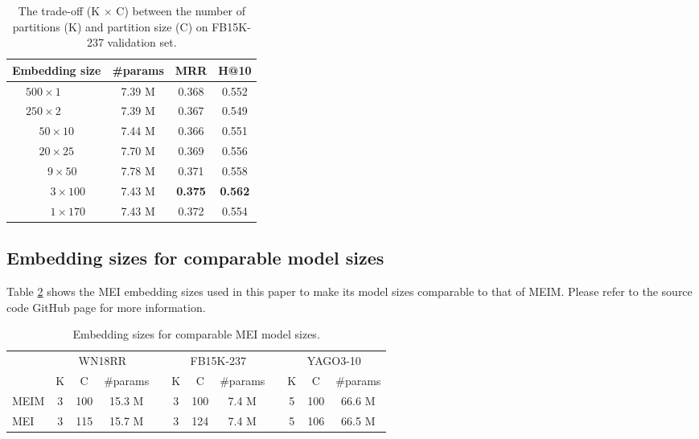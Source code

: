 \documentclass{article}
\theoremstyle{plain}
\theoremstyle{remark}
\begin{document}
\begin{table}[ht]
	\caption[]{The trade-off (K $ \times $ C) between the number of partitions (K) and partition size (C) on FB15K-237 validation set.}
	\label{tab:param_tradeoff}
	\centering  
	\begin{adjustbox}{max width=\linewidth}
		\begin{tabular}{@{\extracolsep{2pt}}cccc}


			Embedding size & \#params & MRR & H@10 \\
			\midrule
			
			$ 500 \times 1 $ \ \ \ \ & 7.39 M & 0.368 & 0.552 \\ $ 250 \times 2 $ \ \ \ \ & 7.39 M & 0.367 & 0.549 \\ $ 50 \times 10 $ & 7.44 M & 0.366 & 0.551 \\ $ 20 \times 25 $ & 7.70 M & 0.369 & 0.556 \\ \ \ $ 9 \times 50 $ & 7.78 M & 0.371 & 0.558 \\ \ \ \ \ $ 3 \times 100 $ & 7.43 M & \textbf{0.375} & \textbf{0.562} \\ \ \ \ \ $ 1 \times 170 $ & 7.43 M & 0.372 & 0.554 \\ 

\end{tabular}
	\end{adjustbox}
\end{table}

\vfill\break

\subsection{Embedding sizes for comparable model sizes}
Table \ref{tab:comparable_size} shows the MEI embedding sizes used in this paper to make its model sizes comparable to that of MEIM. Please refer to the source code GitHub page for more information.

\begin{table}[ht]
	\centering  
	\begin{adjustbox}{max width=\linewidth}
		\begin{tabular}{@{\extracolsep{-4pt}}lccclccclccc}


			& \multicolumn{3}{c}{WN18RR} && \multicolumn{3}{c}{FB15K-237} && \multicolumn{3}{c}{YAGO3-10} \\
			\cmidrule{2-4} \cmidrule{6-8} \cmidrule{10-12}
			& K & C & \#params && K & C & \#params && K & C & \#params \\
\cmidrule{2-4} \cmidrule{6-8} \cmidrule{10-12}
			
			MEIM & 3 & 100 & 15.3 M && 3 & 100 & 7.4 M && 5 & 100 & 66.6 M \\
MEI & 3 & 115 & 15.7 M && 3 & 124 & 7.4 M && 5 & 106 & 66.5 M \\

\end{tabular}
	\end{adjustbox}
	\caption[]{Embedding sizes for comparable MEI model sizes.}
	\label{tab:comparable_size}
\end{table}
\end{document}
